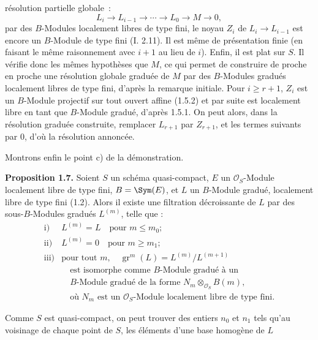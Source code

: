 résolution partielle globale~:
\[
  L_i\longrightarrow L_{i-1}\longrightarrow\cdots\longrightarrow L_0\longrightarrow M\longrightarrow 0,
\]
par des \(B\)-Modules localement libres de type fini, le noyau \(Z_i\) de \(L_i\to L_{i-1}\) est encore un \(B\)-Module de type fini (I. 2.11). Il est même de présentation finie (en faisant le même raisonnement avec \(i+1\) au lieu de \(i\)). Enfin, il est plat sur \(S\). Il vérifie donc les mêmes hypothèses que \(M\), ce qui permet de construire de proche en proche une résolution globale graduée de \(M\) par des \(B\)-Modules gradués localement libres de type fini, d'après la remarque initiale. Pour \(i\geq r+1\), \(Z_i\) est un \(B\)-Module projectif sur tout ouvert affine (1.5.2) et par suite est localement libre en tant que \(B\)-Module gradué, d'après 1.5.1. On peut alors, dans la résolution graduée construite, remplacer \(L_{r+1}\) par \(Z_{r+1}\), et les termes suivants par \(0\), d'où la résolution annoncée.

Montrons enfin le point c) de la démonstration.

\textbf{Proposition 1.7.} Soient \(S\) un schéma quasi-compact, \(E\) un \(\mathcal O_S\)-Module localement libre de type fini, \(B=\Sym(E)\), et \(L\) un \(B\)-Module gradué, localement libre de type fini (1.2). Alors il existe une filtration décroissante de \(L\) par des sous-\(B\)-Modules gradués \(L^{(m)}\), telle que :
\[
\begin{array}{ll}
\text{i)}& L^{(m)}=L\quad\text{pour }m\leq m_0;\\[1mm]
\text{ii)}& L^{(m)}=0\quad\text{pour }m\geq m_1;\\[1mm]
\text{iii)}& \text{pour tout }m,\quad \operatorname{gr}^m(L)=L^{(m)}/L^{(m+1)}\\
&\quad \text{est isomorphe comme }B\text{-Module gradué à un}\\
&\quad B\text{-Module gradué de la forme }N_m\otimes_{\mathcal O_S}B(m),\\
&\quad \text{où }N_m\text{ est un }\mathcal O_S\text{-Module localement libre de type fini.}
\end{array}
\]

Comme \(S\) est quasi-compact, on peut trouver des entiers \(n_0\) et \(n_1\) tels qu'au voisinage de chaque point de \(S\), les éléments d'une base homogène de \(L\)
